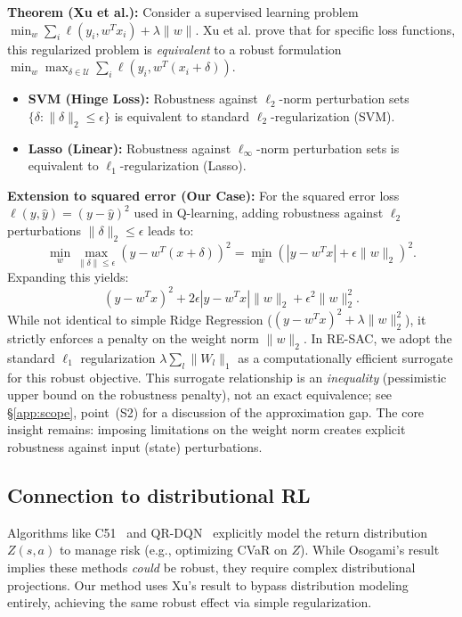 \textbf{Theorem (Xu et al.):}
Consider a supervised learning problem $\min_w \sum_i \ell(y_i, w^T x_i) + \lambda \|w\|$.
Xu et al. prove that for specific loss functions, this regularized problem is \textit{equivalent} to a robust formulation $\min_w \max_{\delta \in \mathcal{U}} \sum_i \ell(y_i, w^T (x_i + \delta))$.
\begin{itemize}
    \item \textbf{SVM (Hinge Loss):} Robustness against $\ell_2$-norm perturbation sets $\{\delta : \|\delta\|_2 \le \epsilon\}$ is equivalent to standard $\ell_2$-regularization (SVM).
    \item \textbf{Lasso (Linear):} Robustness against $\ell_\infty$-norm perturbation sets is equivalent to $\ell_1$-regularization (Lasso).
\end{itemize}

\textbf{Extension to squared error (Our Case):}
For the squared error loss $\ell(y, \hat{y}) = (y - \hat{y})^2$ used in Q-learning, adding robustness against $\ell_2$ perturbations $\|\delta\|_2 \le \epsilon$ leads to:
\begin{equation}
    \min_w \max_{\|\delta\|\le\epsilon} (y - w^T(x+\delta))^2 = \min_w \left( |y-w^T x| + \epsilon \|w\|_2 \right)^2.
\end{equation}
Expanding this yields:
\begin{equation}
    (y-w^T x)^2 + 2\epsilon |y-w^T x| \|w\|_2 + \epsilon^2 \|w\|_2^2.
\end{equation}
While not identical to simple Ridge Regression ($(y-w^T x)^2 + \lambda \|w\|_2^2$), it strictly enforces a penalty on the weight norm $\|w\|_2$.
In RE-SAC, we adopt the standard $\ell_1$ regularization $\lambda \sum_l\|W_l\|_1$ as a computationally efficient surrogate for this robust objective.  This surrogate relationship is an \emph{inequality} (pessimistic upper bound on the robustness penalty), not an exact equivalence; see \S\ref{app:scope}, point~(S2) for a discussion of the approximation gap.  The core insight remains: imposing limitations on the weight norm creates explicit robustness against input (state) perturbations.

\subsection{Connection to distributional RL}
Algorithms like C51~\cite{Bellemare2017Distributional} and QR-DQN~\cite{Dabney2018QuantileRegression} explicitly model the return distribution $Z(s,a)$ to manage risk (e.g., optimizing CVaR on $Z$). While Osogami's result implies these methods \textit{could} be robust, they require complex distributional projections. Our method uses Xu's result to bypass distribution modeling entirely, achieving the same robust effect via simple regularization.

